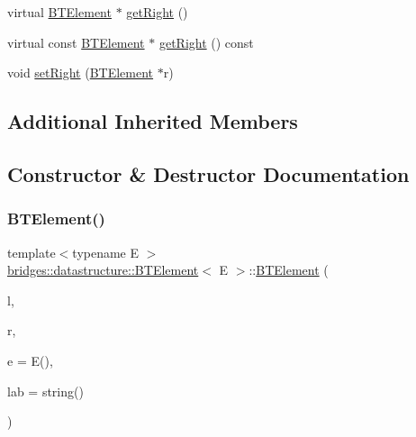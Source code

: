 \begin{DoxyCompactItemize}
virtual \mbox{\hyperlink{classbridges_1_1datastructure_1_1_b_t_element}{B\+T\+Element}} $\ast$ \mbox{\hyperlink{classbridges_1_1datastructure_1_1_b_t_element_a3f73fcc5a7ed1af1a628803879682f80}{get\+Right}} ()
\item 
virtual const \mbox{\hyperlink{classbridges_1_1datastructure_1_1_b_t_element}{B\+T\+Element}} $\ast$ \mbox{\hyperlink{classbridges_1_1datastructure_1_1_b_t_element_afc0f4e1454bbdfb6a61ae9acf606e22a}{get\+Right}} () const
\item 
void \mbox{\hyperlink{classbridges_1_1datastructure_1_1_b_t_element_a016dfb73d148418ba581cfec96375db3}{set\+Right}} (\mbox{\hyperlink{classbridges_1_1datastructure_1_1_b_t_element}{B\+T\+Element}} $\ast$r)
\end{DoxyCompactItemize}
\subsection*{Additional Inherited Members}


\subsection{Constructor \& Destructor Documentation}
\mbox{\label{classbridges_1_1datastructure_1_1_b_t_element_a7d93a35b1f2553cfd92a289a363caa5a}} 
\subsubsection{\texorpdfstring{B\+T\+Element()}{BTElement()}\hspace{0.1cm}{\footnotesize\ttfamily [1/2]}}
{\footnotesize\ttfamily template$<$typename E $>$ \\
\mbox{\hyperlink{classbridges_1_1datastructure_1_1_b_t_element}{bridges\+::datastructure\+::\+B\+T\+Element}}$<$ E $>$\+::\mbox{\hyperlink{classbridges_1_1datastructure_1_1_b_t_element}{B\+T\+Element}} (\begin{DoxyParamCaption}\item[{\mbox{\hyperlink{classbridges_1_1datastructure_1_1_b_t_element}{B\+T\+Element}}$<$ E $>$ $\ast$}]{l,  }\item[{\mbox{\hyperlink{classbridges_1_1datastructure_1_1_b_t_element}{B\+T\+Element}}$<$ E $>$ $\ast$}]{r,  }\item[{const E \&}]{e = {\ttfamily E()},  }\item[{const string \&}]{lab = {\ttfamily string()} }\end{DoxyParamCaption})\hspace{0.3cm}{\ttfamily [inline]}}



